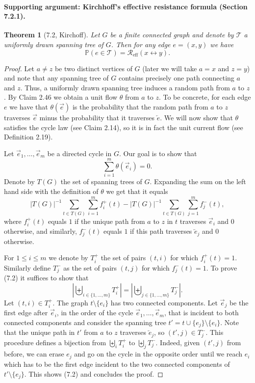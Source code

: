 \documentclass[UTF8,11pt]{ctexart}
\newtheorem*{theorem}{Theorem}
\theoremstyle{definition}
\newcommand{\Prob}{\mathbb P}
\newcommand{\Reff}{\mathcal R_{\mathrm{eff}}}
\begin{document}
\paragraph{Supporting argument: Kirchhoff's effective resistance formula (Section 7.2.1).}
\begin{theorem}[7.2, Kirchoff]
Let $G$ be a finite connected graph and denote by $\mathcal T$ a uniformly drawn spanning tree of $G$. Then for any edge $e=(x,y)$ we have
\[
\Prob(e\in\mathcal T)=\Reff(x\leftrightarrow y).
\]
\end{theorem}
\begin{proof}
Let $a\ne z$ be two distinct vertices of $G$ (later we will take $a=x$ and $z=y$) and note that any spanning tree of $G$ contains precisely one path connecting $a$ and $z$. Thus, a uniformly drawn spanning tree induces a random path from $a$ to $z$. By Claim 2.46 we obtain a unit flow $\theta$ from $a$ to $z$.
To be concrete, for each edge $e$ we have that $\theta(\vec e)$ is the probability that the random path from $a$ to $z$ traverses $\vec e$ minus the probability that it traverses $\overleftarrow e$. We will now show that $\theta$ satisfies the cycle law (see Claim 2.14), so it is in fact the unit current flow (see Definition 2.19).

Let $\vec e_1,\ldots,\vec e_m$ be a directed cycle in $G$. Our goal is to show that
\[
\sum_{i=1}^m\theta(\vec e_i)=0.\tag{7.2}
\]
Denote by $T(G)$ the set of spanning trees of $G$. Expanding the sum on the left hand side with the definition of $\theta$ we get that it equals
\[
|T(G)|^{-1}\sum_{t\in T(G)}\sum_{i=1}^m f_i^+(t)
-|T(G)|^{-1}\sum_{t\in T(G)}\sum_{j=1}^m f_j^-(t),
\]
where $f_i^+(t)$ equals $1$ if the unique path from $a$ to $z$ in $t$ traverses $\vec e_i$ and $0$ otherwise, and similarly, $f_j^-(t)$ equals $1$ if this path traverses $\overleftarrow e_j$ and $0$ otherwise.

For $1\le i\le m$ we denote by $T_i^+$ the set of pairs $(t,i)$ for which $f_i^+(t)=1$. Similarly define $T_j^-$ as the set of pairs $(t,j)$ for which $f_j^-(t)=1$. To prove (7.2) it suffices to show that
\[
\left|\biguplus_{i\in\{1,\ldots,m\}}T_i^+\right|
=\left|\biguplus_{j\in\{1,\ldots,m\}}T_j^-\right|.
\]
Let $(t,i)\in T_i^+$. The graph $t\setminus\{e_i\}$ has two connected components. Let $\vec e_j$ be the first edge after $\vec e_i$, in the order of the cycle $\vec e_1,\ldots,\vec e_m$, that is incident to both connected components and consider the spanning tree $t'=t\cup\{e_j\}\setminus\{e_i\}$. Note that the unique path in $t'$ from $a$ to $z$ traverses $\overleftarrow e_j$, so $(t',j)\in T_j^-$. This procedure defines a bijection from $\biguplus_i T_i^+$ to $\biguplus_j T_j^-$.
Indeed, given $(t',j)$ from before, we can erase $e_j$ and go on the cycle in the opposite order until we reach $e_i$ which has to be the first edge incident to the two connected components of $t'\setminus\{e_j\}$. This shows (7.2) and concludes the proof.
\end{proof}
\end{document}
